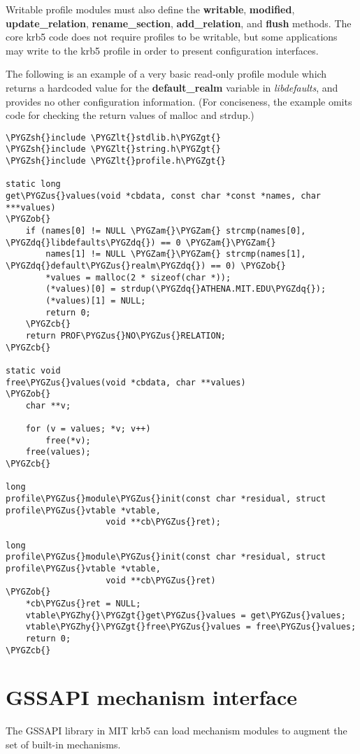 \documentclass[letterpaper,10pt,english]{sphinxmanual}
\def\PYGZus{\char`\_}
\def\PYGZob{\char`\{}
\def\PYGZcb{\char`\}}
\def\PYGZam{\char`\&}
\def\PYGZlt{\char`\<}
\def\PYGZgt{\char`\>}
\def\PYGZsh{\char`\#}
\def\PYGZhy{\char`\-}
\def\PYGZdq{\char`\"}
\begin{document}
Writable profile modules must also define the \textbf{writable},
\textbf{modified}, \textbf{update\_relation}, \textbf{rename\_section},
\textbf{add\_relation}, and \textbf{flush} methods.  The core krb5 code does not
require profiles to be writable, but some applications may write to
the krb5 profile in order to present configuration interfaces.

The following is an example of a very basic read-only profile module
which returns a hardcoded value for the \textbf{default\_realm} variable in
\emph{libdefaults}, and provides no other configuration information.
(For conciseness, the example omits code for checking the return
values of malloc and strdup.)

\begin{Verbatim}[commandchars=\\\{\}]
\PYGZsh{}include \PYGZlt{}stdlib.h\PYGZgt{}
\PYGZsh{}include \PYGZlt{}string.h\PYGZgt{}
\PYGZsh{}include \PYGZlt{}profile.h\PYGZgt{}

static long
get\PYGZus{}values(void *cbdata, const char *const *names, char ***values)
\PYGZob{}
    if (names[0] != NULL \PYGZam{}\PYGZam{} strcmp(names[0], \PYGZdq{}libdefaults\PYGZdq{}) == 0 \PYGZam{}\PYGZam{}
        names[1] != NULL \PYGZam{}\PYGZam{} strcmp(names[1], \PYGZdq{}default\PYGZus{}realm\PYGZdq{}) == 0) \PYGZob{}
        *values = malloc(2 * sizeof(char *));
        (*values)[0] = strdup(\PYGZdq{}ATHENA.MIT.EDU\PYGZdq{});
        (*values)[1] = NULL;
        return 0;
    \PYGZcb{}
    return PROF\PYGZus{}NO\PYGZus{}RELATION;
\PYGZcb{}

static void
free\PYGZus{}values(void *cbdata, char **values)
\PYGZob{}
    char **v;

    for (v = values; *v; v++)
        free(*v);
    free(values);
\PYGZcb{}

long
profile\PYGZus{}module\PYGZus{}init(const char *residual, struct profile\PYGZus{}vtable *vtable,
                    void **cb\PYGZus{}ret);

long
profile\PYGZus{}module\PYGZus{}init(const char *residual, struct profile\PYGZus{}vtable *vtable,
                    void **cb\PYGZus{}ret)
\PYGZob{}
    *cb\PYGZus{}ret = NULL;
    vtable\PYGZhy{}\PYGZgt{}get\PYGZus{}values = get\PYGZus{}values;
    vtable\PYGZhy{}\PYGZgt{}free\PYGZus{}values = free\PYGZus{}values;
    return 0;
\PYGZcb{}
\end{Verbatim}


\section{GSSAPI mechanism interface}
\label{plugindev/gssapi::doc}\label{plugindev/gssapi:gssapi-mechanism-interface}
The GSSAPI library in MIT krb5 can load mechanism modules to augment
the set of built-in mechanisms.
\end{document}
